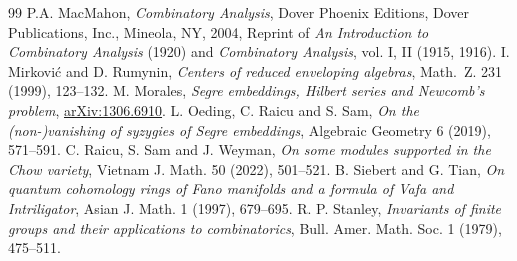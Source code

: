 \documentclass[a4paper,11pt]{amsart}
\theoremstyle{plain}
\theoremstyle{definition}
\begin{document}
\begin{thebibliography}{99}
 P.A. MacMahon, {\em Combinatory Analysis}, Dover Phoenix Editions, Dover Publications, Inc., Mineola, NY, 2004, Reprint of {\em An Introduction to Combinatory Analysis} (1920) and {\em Combinatory Analysis}, vol. I, II (1915, 1916).
 I. Mirkovi\'c and D. Rumynin, {\em Centers of reduced enveloping algebras}, Math.~Z. 231 (1999), 123--132. 
 M. Morales, {\em Segre embeddings, Hilbert series and Newcomb’s problem}, \href{https://arxiv.org/abs/1306.6910}{arXiv:1306.6910}. 
 L. Oeding, C. Raicu and S. Sam, {\em On the (non-)vanishing of syzygies of Segre embeddings}, Algebraic Geometry 6 (2019), 571--591.
 C. Raicu, S. Sam and J. Weyman, {\em On some modules supported in the Chow variety}, Vietnam J. Math. 50 (2022), 501--521.
 B. Siebert and G. Tian, {\em On quantum cohomology rings of Fano manifolds and a formula of Vafa and Intriligator}, Asian J. Math. 1 (1997), 679--695.
 R. P. Stanley, {\em Invariants of finite groups and their applications to combinatorics}, Bull. Amer. Math. Soc. 1 (1979), 475--511.
\end{thebibliography}
\end{document}

